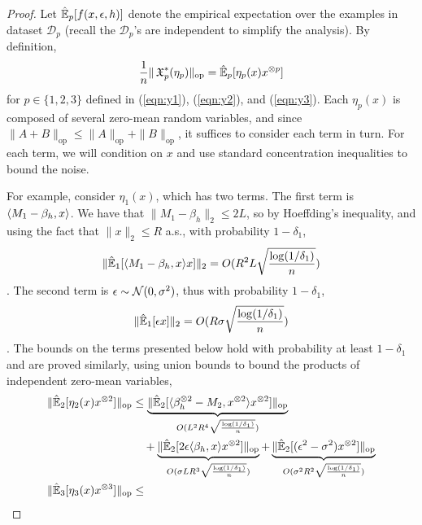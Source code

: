 \documentclass[tablecaption=bottom]{jmlr}
\newcommand\refeqn[1]{(\ref{eqn:#1})}
\newcommand\sD{\ensuremath{\mathcal{D}}}
\newcommand\op{{\textrm{op}}}
\newcommand{\Lop}{\textrm{op}}
\begin{document}
\begin{proof}
Let $\hat{\operatorname{\mathbb{E}}}_p[f(x,\epsilon,h)]$ denote the empirical expectation over
the examples in dataset $\sD_p$ (recall the $\sD_p$'s are independent to
simplify the analysis).  By definition,
$$\frac1n \|\opX_p^*(\eta_p)\|_\op = \hat\E_p[\eta_p(x) x\tp{p}]$$
for $p \in \{1,2,3\}$ defined in \refeqn{y1}, \refeqn{y2}, and
\refeqn{y3}. Each $\eta_p(x)$ is composed of several zero-mean random
variables, and since $\|A + B\|_\op \le \|A\|_\op + \|B\|_\op$, it
suffices to consider each term in turn. 
For each term, we will
condition on $x$ and use standard concentration inequalities to bound
the noise. 

For example, consider $\eta_1(x)$, which has two terms. 
The first term is $\langle M_1 - \beta_h, x \rangle$.  We have that $\|M_1 - \beta_h\|_2 \le 2L$, so by Hoeffding's inequality, and using the fact that $\|x\|_2 \le R$ a.s., with probability $1-\delta_1$, $$\|\hat{\operatorname{\mathbb{E}}}_1[\langle M_1 - \beta_h, x \rangle x]\|_2 = O(R^2 L \sqrt{\frac{\log(1/\delta_1)}{n}})$$. 
The second term is $\epsilon \sim \mathcal{N}(0, \sigma^2)$, thus with probability $1-\delta_1$, $$\|\hat{\operatorname{\mathbb{E}}}_1[\epsilon x]\|_2 = O(R \sigma \sqrt{\frac{\log(1/\delta_1)}{n}})$$. 
The bounds on the terms presented below hold with probability at least $1-\delta_1$ and are proved similarly, using union bounds to bound the products of independent zero-mean variables,
{
\begin{align*}
    \| \hat\E_2[ \eta_2(x) x\tp{2} ] \|_\Lop &\le 
            \underbrace{ \|\hat\E_2[\innerp{\beta_h\tp{2} - M_2}{x\tp{2}} x\tp{2}]\|_\op }_{ O( L^2 R^4      \sqrt{\frac{\log(1/\delta_1)}{n}} ) } \\
   &\quad + \underbrace{ \|\hat\E_2[2 \epsilon \innerp{\beta_h}{x} x\tp{2}]\|_\op        }_{ O( \sigma L R^3 \sqrt{\frac{\log(1/\delta_1)}{n}} ) } 
          + \underbrace{ \|\hat\E_2[(\epsilon^2 - \sigma^2) x\tp{2}]\|_\op               }_{ O( \sigma^2 R^2 \sqrt{\frac{\log(1/\delta_1)}{n}} ) } \\
  \| \hat\E_3[ \eta_3(x) x\tp{3} ] \|_\Lop &\le 

\end{align*}}
\end{proof}
\end{document}
